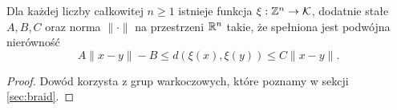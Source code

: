 \begin{proposition}
    Dla każdej liczby całkowitej $n \ge 1$ istnieje funkcja $\xi: \mathbb Z^n \to \mathcal{K}$, dodatnie stałe $A, B, C$ oraz norma $\|\cdot\|$ na przestrzeni $\mathbb R^n$ takie, że spełniona jest podwójna nierówność
    \begin{equation}
        A\|x-y\|  - B \le d(\xi(x), \xi(y)) \le C\|x-y\|.
    \end{equation}
\end{proposition}

\begin{proof}
    Dowód korzysta z grup warkoczowych, które poznamy w sekcji \ref{sec:braid}.
\end{proof}

